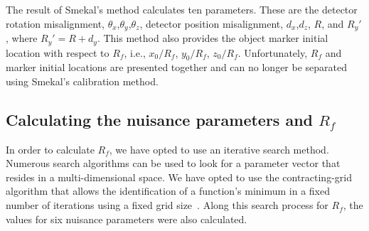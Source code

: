The result of Smekal's method calculates ten parameters.  These are the detector rotation misalignment, $\theta_x$,$\theta_y$,$\theta_z$, detector position misalignment, $d_x$,$d_z$, $R$, and $R_y'$, where $R_y' = R + d_y$.  This method also provides the object marker initial location with respect to $R_f$, i.e., $x_0/R_f$, $y_0/R_f$, $z_0/R_f$.  Unfortunately, $R_f$ and marker initial locations are presented together and can no longer be separated using Smekal's calibration method.


\subsection{Calculating the nuisance parameters and $R_{f}$}
In order to calculate $R_f$, we have opted to use an iterative search method.  Numerous search algorithms can be used to look for a parameter vector that resides in a multi-dimensional space.  We have opted to use the contracting-grid algorithm that allows the identification of a function's minimum in a fixed number of iterations using a fixed grid size~\citep{Hesterman2010}.  Along this search process for $R_f$, the values for six nuisance parameters were also calculated.

